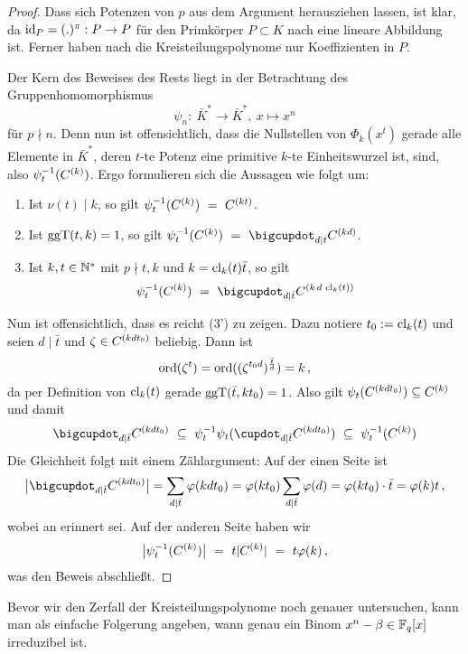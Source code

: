 \begin{proof}
  Dass sich Potenzen von $p$ aus dem Argument herausziehen lassen, ist klar,
  da $\operatorname{id}_P = (.)^\pi: P \to P$ für den Primkörper $P \subset K$ nach 
   eine lineare Abbildung ist. 
  Ferner haben nach  die
  Kreisteilungspolynome nur Koeffizienten in $P$.

  Der Kern des Beweises des Rests liegt in der Betrachtung des 
  Gruppenhomomorphismus
  \[ \psi_n:\ \bar K^\ast \to \bar K^\ast,\ x \mapsto x^n\]
  für $p\nmid n$. Denn nun ist offensichtlich, dass die Nullstellen von 
  $\Phi_k(x^t)$ gerade alle Elemente in $\bar K^\ast$, deren $t$-te Potenz
  eine primitive $k$-te Einheitswurzel ist, sind, also $\psi_t^{-1}(C^{(k)})$.
  Ergo formulieren sich die Aussagen wie folgt um:
  \begin{enumerate}[label=(\arabic*')]
    \item Ist $\nu(t) \mid k$, so gilt
      $\psi_t^{-1}(C^{(k)}) \ =\  C^{(kt)}$.
    \item Ist $\operatorname{ggT}(t,k)=1$, so gilt
      $\psi_t\inv(C\kl k) \speq= \bigcupdot_{d\mid t} C\kl{kd}$.
    \item Ist $k,t\in \mathbb{N}^\ast$ mit $p\nmid t,k$ und $k = \operatorname{cl}_k(t) \bar t$,
      so gilt
      \[ \psi_t\inv(C\kl k) \speq= 
        \bigcupdot_{d\mid \bar t} C\kl{k\,d\,\cl_k(t)}\]
  \end{enumerate}
  Nun ist offensichtlich, dass es reicht (3') zu zeigen. 
  Dazu notiere $t_0 := \operatorname{cl}_k(t)$ und seien $d\mid \bar t$ 
  und $\zeta \in C^{(kd t_0)}$ beliebig. Dann ist 
  \[ \operatorname{ord}(\zeta^t) = \operatorname{ord}((\zeta^{t_0d})^{\frac{\bar t}{d}})
    = k\,,\]
  da per Definition von $\operatorname{cl}_k(t)$ gerade $\operatorname{ggT}(\bar t, kt_0) = 1$.
  Also gilt $\psi_t(C^{(kdt_0)}) \subseteq C^{(k)}$
  und damit
  \[ \bigcupdot_{d\mid \bar t} C\kl{kdt_0} \speq\subseteq 
    \psi_t\inv \psi_t ( \cupdot_{d\mid \bar t} C\kl{kdt_0}) 
    \speq\subseteq \psi_t\inv(C\kl k)\]
  Die Gleichheit folgt mit einem Zählargument:
  Auf der einen Seite ist
  \[ \big|\bigcupdot_{d\mid \bar t} C\kl{kdt_0}\big| = 
    \sum_{d\mid \bar t} \varphi(kdt_0) = 
    \varphi(kt_0)\sum_{d\mid \bar t}\varphi(d) = \varphi(kt_0) \cdot \bar t
     = \varphi(k)t\,,\]
  wobei an  erinnert sei.
  Auf der anderen Seite haben wir
  \[ \big| \psi_t^{-1}(C ^{(k)})\big| \ =\  t |C^{(k)}| \ =\  t \varphi(k)\,,\]
  was den Beweis abschließt.
\end{proof}

Bevor wir den Zerfall der Kreisteilungspolynome noch genauer untersuchen,
kann man als einfache Folgerung angeben, wann genau ein
Binom $x^n-\beta \in \mathbb{F}_q[x]$ irreduzibel ist.

